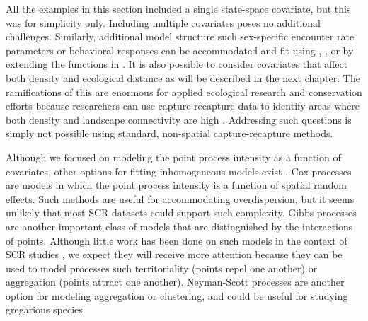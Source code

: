 All the examples in this section included a single state-space
covariate, but this was for simplicity only. Including multiple
covariates poses no additional challenges. Similarly, additional model
structure such sex-specific encounter rate parameters or behavioral
responses can be accommodated and fit using \secr, \bugs, or by
extending the functions in \scrbook. It is also possible to consider
covariates that affect both density and ecological
distance as will be described in the next chapter. The ramifications of this are enormous for applied
ecological research and conservation efforts because %
researchers can use capture-recapture data to identify areas where
both density and landscape connectivity are high
\citep{royle_etal:2012ecol}. Addressing such questions
is simply not possible using standard, non-spatial capture-recapture
methods. %


Although we focused on modeling the point process intensity as a
function of covariates, other options for fitting inhomogeneous models
exist \citep{illian_etal:2008}. Cox processes are models in which the
point process intensity is a function of spatial random effects. Such
methods are useful for accommodating overdispersion, but it seems unlikely that
most SCR datasets could support such complexity. Gibbs processes
are another important class of models that are distinguished by the
interactions of points. Although little work has been done on such
models in the context of SCR studies \citep{reich_etal:2012}, we
expect they will receive more
attention because they can be used to model processes such
territoriality (points repel one another) or aggregation (points
attract one another). Neyman-Scott processes are another option for
modeling aggregation or clustering, and could be useful for studying
gregarious species.

